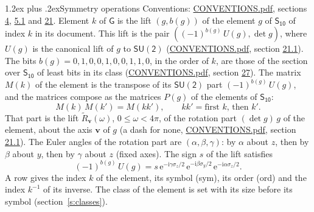 \documentclass[10pt,a4paper]{article}
\makeatletter
\renewcommand\section{\@startsection{section}{1}{\z@}{-3ex plus -1ex minus -.2ex}%
  {1.2ex plus .2ex}{\normalfont\large\sffamily\bfseries\color{parttitle}}}
\numberwithin{equation}{section}
\newcommand{\grp}[1]{\mathsf{#1}}
\newcommand{\vv}{\mathbf{v}}
\newcommand{\iunit}{\mathrm{i}}
\newcommand{\expe}{\mathrm{e}}
\newcommand{\lift}[1]{\tilde{#1}}
\newcommand{\pauli}[1]{\sigma_{#1}}
\makeatother
\begin{document}
\section{Symmetry operations}\label{s:elements}
Conventions: \href{../../CONVENTIONS.pdf}{CONVENTIONS.pdf}, sections \href{../../../rotation/CONVENTIONS.pdf\#conv.4}{4}, \href{../../../rotation/CONVENTIONS.pdf\#conv.5.1}{5.1} and \href{../../CONVENTIONS.pdf\#conv.21}{21}.
\leavevmode\label{n:index.element}\label{n:element.g}\label{n:function.section}Element $k$ of $\grp{G}$ is the lift $(g, b(g))$ of the element $g$ of \href{../../../rotation/data/pdf/S10.pdf}{$\grp{S_{10}}$} of index $k$ in its document. This lift is the pair $((-1)^{b(g)}\,U(g), \det g)$, where $U(g)$ is the canonical lift of $g$ to $\grp{SU(2)}$ (\href{../../CONVENTIONS.pdf}{CONVENTIONS.pdf}, section \href{../../CONVENTIONS.pdf\#conv.21.1}{21.1}). The bits $b(g) = 0, 1, 0, 0, 1, 0, 0, 1, 1, 0$, in the order of $k$, are those of the section over $\grp{S_{10}}$ of least bits in its class (\href{../../CONVENTIONS.pdf}{CONVENTIONS.pdf}, section \href{../../CONVENTIONS.pdf\#conv.27}{27}). \label{n:matrix.element.pin}\label{n:matrix.element}The matrix $M(k)$ of the element is the transpose of its $\grp{SU(2)}$ part $(-1)^{b(g)}\,U(g)$, and the matrices compose as the matrices $P(g)$ of the elements of $\grp{S_{10}}$:
\begin{equation}\label{e:mprod}M(k)\,M(k') = M(kk'),\qquad kk' = \text{first } k\text{, then } k'.\end{equation}
\leavevmode\label{n:angle.omega}\label{n:vector.axis}\label{n:vector.pole}That part is the lift $\lift{R}_{\vv}(\omega)$, $0 \le \omega < 4\pi$, of the rotation part $(\det g)\,g$ of the element, about the axis $\vv$ of $g$ (a dash for none, \href{../../CONVENTIONS.pdf}{CONVENTIONS.pdf}, section \href{../../CONVENTIONS.pdf\#conv.21.1}{21.1}). \label{n:angle.euler.alpha}\label{n:angle.euler.beta}\label{n:angle.euler.gamma}\label{n:vector.coordinates}The Euler angles of the rotation part are $(\alpha,\beta,\gamma)$: by $\alpha$ about $z$, then by $\beta$ about $y$, then by $\gamma$ about $z$ (fixed axes). \label{n:local.euler.sign}The sign $s$ of the lift satisfies
\begin{equation}\label{e:euler}(-1)^{b(g)}\,U(g) = s\,\expe^{-\iunit\gamma\pauli{z}/2}\,\expe^{-\iunit\beta\pauli{y}/2}\,\expe^{-\iunit\alpha\pauli{z}/2}.\end{equation}
\leavevmode\label{n:index.element.inverse}\label{n:head.sym}\label{n:head.ord}A row gives the index $k$ of the element, its symbol (sym), its order (ord) and the index $k^{-1}$ of its inverse. \label{n:head.class}The class of the element is set with its size before its symbol (section~\ref{s:classes}).
\end{document}
